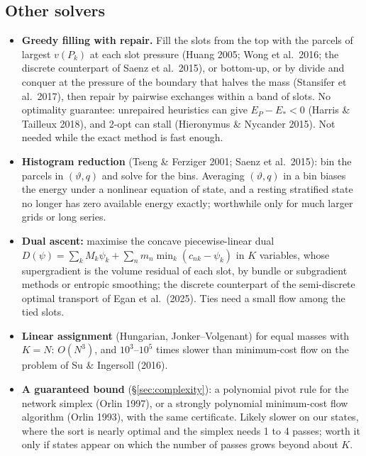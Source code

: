 \documentclass[11pt,a4paper]{article}
\newcommand{\vt}{\vartheta}
\begin{document}
\subsection{Other solvers}
\begin{itemize}
  \item \textbf{Greedy filling with repair.} Fill the slots from the top with the parcels of largest $v(P_k)$ at each slot
        pressure (Huang 2005; Wong et al.\ 2016; the discrete counterpart of Saenz et al.\ 2015), or bottom-up, or by divide and
        conquer at the pressure of the boundary that halves the mass (Stansifer et al.\ 2017), then repair by pairwise
        exchanges within a band of slots. No optimality guarantee: unrepaired heuristics can give $E_P-E_*<0$ (Harris \&
        Tailleux 2018), and 2-opt can stall (Hieronymus \& Nycander 2015). Not needed while the exact method is fast enough.
  \item \textbf{Histogram reduction} (Tseng \& Ferziger 2001; Saenz et al.\ 2015): bin the parcels in $(\vt,q)$ and solve for the
        bins. Averaging $(\vt,q)$ in a bin biases the energy under a nonlinear equation of state, and a resting stratified state no
        longer has zero available energy exactly; worthwhile only for much larger grids or long series.
  \item \textbf{Dual ascent:} maximise the concave piecewise-linear dual
        $D(\psi)=\sum_kM_k\psi_k+\sum_nm_n\min_k(c_{nk}-\psi_k)$ in $K$ variables, whose supergradient is the volume residual of each
        slot, by bundle or subgradient methods or entropic smoothing; the discrete counterpart of the semi-discrete optimal
        transport of Egan et al.\ (2025). Ties need a small flow among the tied slots.
  \item \textbf{Linear assignment} (Hungarian, Jonker--Volgenant) for equal masses with $K=N$: $O(N^3)$, and $10^3$--$10^5$ times
        slower than minimum-cost flow on the problem of Su \& Ingersoll (2016).
  \item \textbf{A guaranteed bound} (\S\ref{sec:complexity}): a polynomial pivot rule for the network simplex (Orlin 1997), or a
        strongly polynomial minimum-cost flow algorithm (Orlin 1993), with the same certificate. Likely slower on our states,
        where the sort is nearly optimal and the simplex needs 1 to 4 passes; worth it only if states appear on which the
        number of passes grows beyond about $K$.
\end{itemize}
\end{document}
